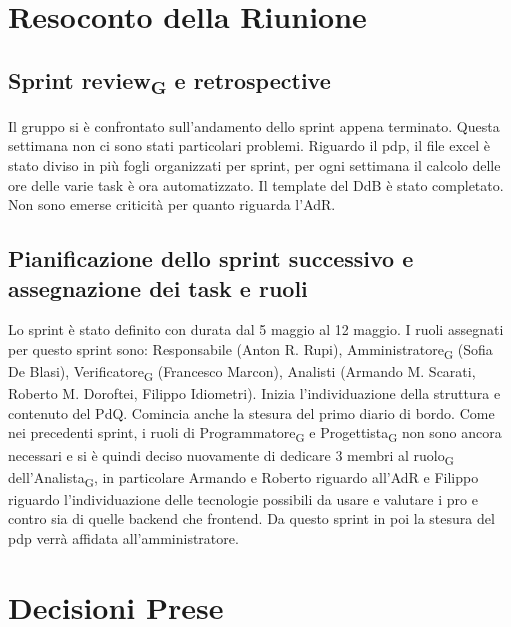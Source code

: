 \section{Resoconto della Riunione}

\subsection{Sprint review\textsubscript{G} e retrospective}
Il gruppo si è confrontato sull'andamento dello sprint appena terminato. Questa settimana non ci sono stati particolari problemi. Riguardo il pdp, il file excel è stato diviso in più fogli organizzati per sprint, per ogni settimana il calcolo delle ore delle varie task è ora automatizzato. Il template del DdB è stato completato. Non sono emerse criticità per quanto riguarda l'AdR.

\subsection{Pianificazione dello sprint successivo e assegnazione dei task e ruoli}
Lo sprint è stato definito con durata dal 5 maggio al 12 maggio. I ruoli assegnati per questo sprint sono: 
Responsabile (Anton R. Rupi), Amministratore\textsubscript{G} (Sofia De Blasi), Verificatore\textsubscript{G} (Francesco Marcon), 
Analisti (Armando M. Scarati, Roberto M. Doroftei, Filippo Idiometri).
Inizia l'individuazione della struttura e contenuto del PdQ. Comincia anche la stesura del primo diario di bordo.
Come nei precedenti sprint, i ruoli di Programmatore\textsubscript{G} e Progettista\textsubscript{G} non sono ancora necessari e si è quindi 
deciso nuovamente di dedicare 3 membri al ruolo\textsubscript{G} dell'Analista\textsubscript{G}, in particolare Armando e Roberto riguardo all'AdR e Filippo riguardo l'individuazione delle tecnologie possibili da usare e valutare i pro e contro sia di quelle backend che frontend. Da questo sprint in poi la stesura del pdp verrà affidata all'amministratore.
\section{Decisioni Prese}

